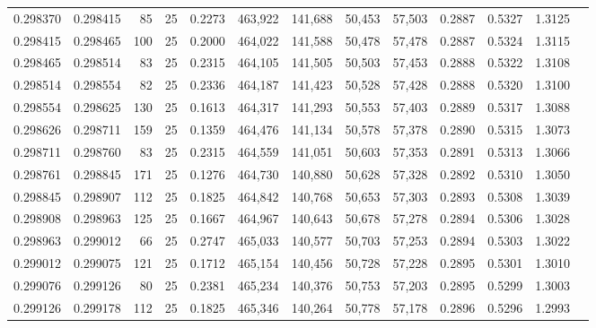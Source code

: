 \begin{tabular}{rrrrrrrrrrrrr}
0.298370 & 0.298415 &    85 &  25 &                                     0.2273 & 463,922 & 141,688 &  50,453 &  57,503 & 0.2887 & 0.5327 & 1.3125 \\
0.298415 & 0.298465 &   100 &  25 &                                     0.2000 & 464,022 & 141,588 &  50,478 &  57,478 & 0.2887 & 0.5324 & 1.3115 \\
0.298465 & 0.298514 &    83 &  25 &                                     0.2315 & 464,105 & 141,505 &  50,503 &  57,453 & 0.2888 & 0.5322 & 1.3108 \\
0.298514 & 0.298554 &    82 &  25 &                                     0.2336 & 464,187 & 141,423 &  50,528 &  57,428 & 0.2888 & 0.5320 & 1.3100 \\
0.298554 & 0.298625 &   130 &  25 &                                     0.1613 & 464,317 & 141,293 &  50,553 &  57,403 & 0.2889 & 0.5317 & 1.3088 \\
0.298626 & 0.298711 &   159 &  25 &                                     0.1359 & 464,476 & 141,134 &  50,578 &  57,378 & 0.2890 & 0.5315 & 1.3073 \\
0.298711 & 0.298760 &    83 &  25 &                                     0.2315 & 464,559 & 141,051 &  50,603 &  57,353 & 0.2891 & 0.5313 & 1.3066 \\
0.298761 & 0.298845 &   171 &  25 &                                     0.1276 & 464,730 & 140,880 &  50,628 &  57,328 & 0.2892 & 0.5310 & 1.3050 \\
0.298845 & 0.298907 &   112 &  25 &                                     0.1825 & 464,842 & 140,768 &  50,653 &  57,303 & 0.2893 & 0.5308 & 1.3039 \\
0.298908 & 0.298963 &   125 &  25 &                                     0.1667 & 464,967 & 140,643 &  50,678 &  57,278 & 0.2894 & 0.5306 & 1.3028 \\
0.298963 & 0.299012 &    66 &  25 &                                     0.2747 & 465,033 & 140,577 &  50,703 &  57,253 & 0.2894 & 0.5303 & 1.3022 \\
0.299012 & 0.299075 &   121 &  25 &                                     0.1712 & 465,154 & 140,456 &  50,728 &  57,228 & 0.2895 & 0.5301 & 1.3010 \\
0.299076 & 0.299126 &    80 &  25 &                                     0.2381 & 465,234 & 140,376 &  50,753 &  57,203 & 0.2895 & 0.5299 & 1.3003 \\
0.299126 & 0.299178 &   112 &  25 &                                     0.1825 & 465,346 & 140,264 &  50,778 &  57,178 & 0.2896 & 0.5296 & 1.2993 \\

\end{tabular}
